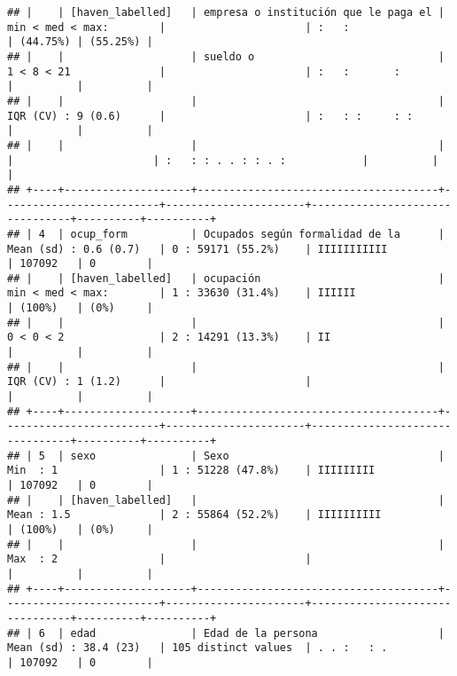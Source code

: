 \documentclass[]{article}
\begin{document}
\begin{verbatim}
## |    | [haven_labelled]   | empresa o institución que le paga el | min < med < max:        |                      | :   :                          | (44.75%) | (55.25%) |
## |    |                    | sueldo o                             | 1 < 8 < 21              |                      | :   :       :                  |          |          |
## |    |                    |                                      | IQR (CV) : 9 (0.6)      |                      | :   : :     : :                |          |          |
## |    |                    |                                      |                         |                      | :   : : . . : : . :            |          |          |
## +----+--------------------+--------------------------------------+-------------------------+----------------------+--------------------------------+----------+----------+
## | 4  | ocup_form          | Ocupados según formalidad de la      | Mean (sd) : 0.6 (0.7)   | 0 : 59171 (55.2%)    | IIIIIIIIIII                    | 107092   | 0        |
## |    | [haven_labelled]   | ocupación                            | min < med < max:        | 1 : 33630 (31.4%)    | IIIIII                         | (100%)   | (0%)     |
## |    |                    |                                      | 0 < 0 < 2               | 2 : 14291 (13.3%)    | II                             |          |          |
## |    |                    |                                      | IQR (CV) : 1 (1.2)      |                      |                                |          |          |
## +----+--------------------+--------------------------------------+-------------------------+----------------------+--------------------------------+----------+----------+
## | 5  | sexo               | Sexo                                 | Min  : 1                | 1 : 51228 (47.8%)    | IIIIIIIII                      | 107092   | 0        |
## |    | [haven_labelled]   |                                      | Mean : 1.5              | 2 : 55864 (52.2%)    | IIIIIIIIII                     | (100%)   | (0%)     |
## |    |                    |                                      | Max  : 2                |                      |                                |          |          |
## +----+--------------------+--------------------------------------+-------------------------+----------------------+--------------------------------+----------+----------+
## | 6  | edad               | Edad de la persona                   | Mean (sd) : 38.4 (23)   | 105 distinct values  | . . :   : .                    | 107092   | 0        |

\end{verbatim}
\end{document}
